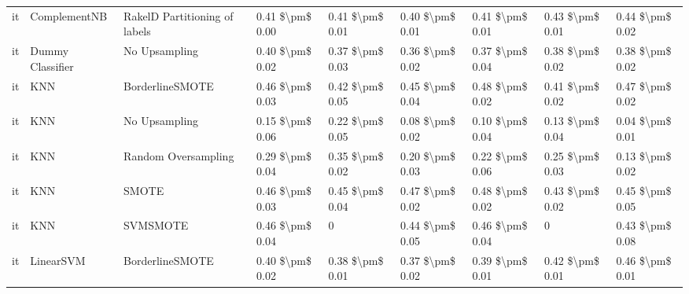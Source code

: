 \begin{tabular}{lllllllll}
      it &                    ComplementNB & RakelD Partitioning of labels & 0.41 \$\textbackslash pm\$ 0.00 &           0.41 \$\textbackslash pm\$ 0.01 &       0.40 \$\textbackslash pm\$ 0.01 &        0.41 \$\textbackslash pm\$ 0.01 &                         0.43 \$\textbackslash pm\$ 0.01 &     0.44 \$\textbackslash pm\$ 0.02 \\
      it &                Dummy Classifier &                 No Upsampling & 0.40 \$\textbackslash pm\$ 0.02 &           0.37 \$\textbackslash pm\$ 0.03 &       0.36 \$\textbackslash pm\$ 0.02 &        0.37 \$\textbackslash pm\$ 0.04 &                         0.38 \$\textbackslash pm\$ 0.02 &     0.38 \$\textbackslash pm\$ 0.02 \\
      it &                             KNN &               BorderlineSMOTE & 0.46 \$\textbackslash pm\$ 0.03 &           0.42 \$\textbackslash pm\$ 0.05 &       0.45 \$\textbackslash pm\$ 0.04 &        0.48 \$\textbackslash pm\$ 0.02 &                         0.41 \$\textbackslash pm\$ 0.02 &     0.47 \$\textbackslash pm\$ 0.02 \\
      it &                             KNN &                 No Upsampling & 0.15 \$\textbackslash pm\$ 0.06 &           0.22 \$\textbackslash pm\$ 0.05 &       0.08 \$\textbackslash pm\$ 0.02 &        0.10 \$\textbackslash pm\$ 0.04 &                         0.13 \$\textbackslash pm\$ 0.04 &     0.04 \$\textbackslash pm\$ 0.01 \\
      it &                             KNN &           Random Oversampling & 0.29 \$\textbackslash pm\$ 0.04 &           0.35 \$\textbackslash pm\$ 0.02 &       0.20 \$\textbackslash pm\$ 0.03 &        0.22 \$\textbackslash pm\$ 0.06 &                         0.25 \$\textbackslash pm\$ 0.03 &     0.13 \$\textbackslash pm\$ 0.02 \\
      it &                             KNN &                         SMOTE & 0.46 \$\textbackslash pm\$ 0.03 &           0.45 \$\textbackslash pm\$ 0.04 &       0.47 \$\textbackslash pm\$ 0.02 &        0.48 \$\textbackslash pm\$ 0.02 &                         0.43 \$\textbackslash pm\$ 0.02 &     0.45 \$\textbackslash pm\$ 0.05 \\
      it &                             KNN &                      SVMSMOTE & 0.46 \$\textbackslash pm\$ 0.04 &                         0 &       0.44 \$\textbackslash pm\$ 0.05 &        0.46 \$\textbackslash pm\$ 0.04 &                                       0 &     0.43 \$\textbackslash pm\$ 0.08 \\
      it &                       LinearSVM &               BorderlineSMOTE & 0.40 \$\textbackslash pm\$ 0.02 &           0.38 \$\textbackslash pm\$ 0.01 &       0.37 \$\textbackslash pm\$ 0.02 &        0.39 \$\textbackslash pm\$ 0.01 &                         0.42 \$\textbackslash pm\$ 0.01 &     0.46 \$\textbackslash pm\$ 0.01 \\

\end{tabular}
